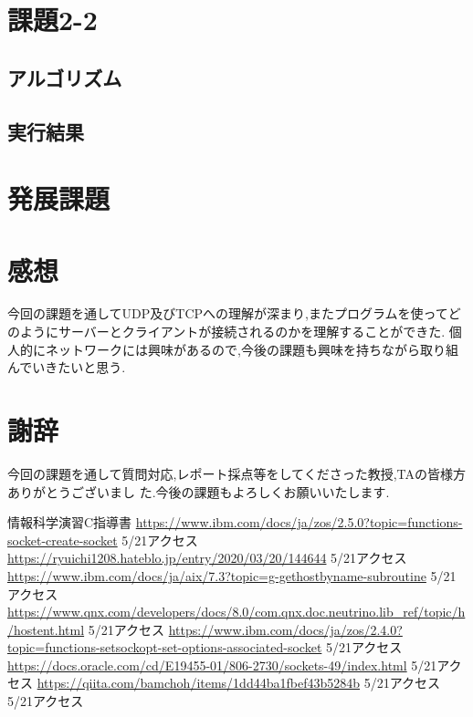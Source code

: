 \documentclass[dvipdfmx]{jarticle}
\begin{document}
\section{課題2-2}
\subsection{アルゴリズム}

\subsection{実行結果}

\section{発展課題}

\section{感想}
今回の課題を通してUDP及びTCPへの理解が深まり,またプログラムを使ってどのようにサーバーとクライアントが接続されるのかを理解することができた.
個人的にネットワークには興味があるので,今後の課題も興味を持ちながら取り組んでいきたいと思う.
\section{謝辞}
今回の課題を通して質問対応,レポート採点等をしてくださった教授,TAの皆様方ありがとうございまし
た.今後の課題もよろしくお願いいたします.
\begin{thebibliography}{99}
    情報科学演習C指導書
     \url{https://www.ibm.com/docs/ja/zos/2.5.0?topic=functions-socket-create-socket} 5/21アクセス
     \url{https://ryuichi1208.hateblo.jp/entry/2020/03/20/144644} 5/21アクセス
     \url{https://www.ibm.com/docs/ja/aix/7.3?topic=g-gethostbyname-subroutine} 5/21アクセス
     \url{https://www.qnx.com/developers/docs/8.0/com.qnx.doc.neutrino.lib_ref/topic/h/hostent.html} 5/21アクセス
     \url{https://www.ibm.com/docs/ja/zos/2.4.0?topic=functions-setsockopt-set-options-associated-socket} 5/21アクセス
     \url{https://docs.oracle.com/cd/E19455-01/806-2730/sockets-49/index.html} 5/21アクセス
     \url{https://qiita.com/bamchoh/items/1dd44ba1fbef43b5284b} 5/21アクセス
     \url{} 5/21アクセス
\end{thebibliography}
\end{document}
